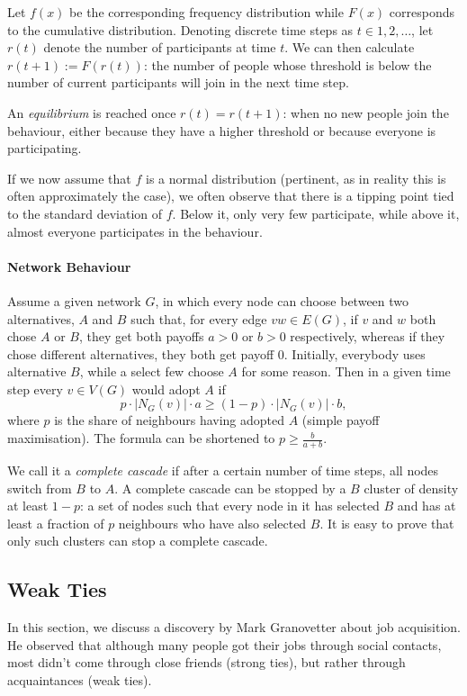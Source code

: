 \documentclass[english]{panikzettel}
\begin{document}
Let $f(x)$ be the corresponding frequency distribution while $F(x)$ corresponds to the cumulative distribution.
Denoting discrete time steps as $t \in 1,2,\dots$, let $r(t)$ denote the number of participants at time $t$.
We can then calculate $r(t+1) := F(r(t))$: the number of people whose threshold is below the number of current participants will join in the next time step.

An \textit{equilibrium} is reached once $r(t) = r(t+1)$: when no new people join the behaviour, either because they have a higher threshold or because everyone is participating.

If we now assume that $f$ is a normal distribution (pertinent, as in reality this is often approximately the case), we often observe that there is a tipping point tied to the standard deviation of $f$.
Below it, only very few participate, while above it, almost everyone participates in the behaviour.

\paragraph{Network Behaviour}

Assume a given network $G$, in which every node can choose between two alternatives, $A$ and $B$ such that, for every edge $vw \in E(G)$, if $v$ and $w$ both chose $A$ or $B$, they get both payoffs $a > 0$ or $b > 0$ respectively, whereas if they chose different alternatives, they both get payoff 0.
Initially, everybody uses alternative $B$, while a select few choose $A$ for some reason.
Then in a given time step every $v \in V(G)$ would adopt $A$ if $$p \cdot |N_G(v)| \cdot a \ge (1-p) \cdot |N_G(v)| \cdot b,$$ where $p$ is the share of neighbours having adopted $A$ (simple payoff maximisation).
The formula can be shortened to $p \ge \frac{b}{a + b}$.

We call it a \textit{complete cascade} if after a certain number of time steps, all nodes switch from $B$ to $A$.
A complete cascade can be stopped by a $B$ cluster of density at least $1 - p$: a set of nodes such that every node in it has selected $B$ and has at least a fraction of $p$ neighbours who have also selected $B$.
It is easy to prove that only such clusters can stop a complete cascade.

\subsection{Weak Ties}

In this section, we discuss a discovery by Mark Granovetter about job acquisition.
He observed that although many people got their jobs through social contacts, most didn't come through close friends (strong ties), but rather through acquaintances (weak ties).
\end{document}

